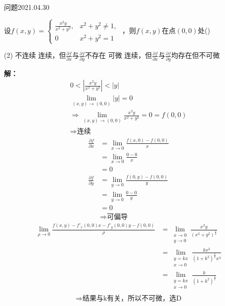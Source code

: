 \begin{mybox}{问题2021.04.30}
	
	\qquad 设$f(x,y)= \begin{cases}
		
		\frac{x^2y}{x^2+y^2},&x^2+y^2\ne 1,\\
		
		0&
		
		x^2+y^2=1
		
	\end{cases}$ ，则$f(x,y)$在点$(0,0)$处() 
	
	\begin{tasks}(2)
		\task 不连续
		\task 连续，但$\frac{\partial{f}}{\partial{x}}$与$\frac{\partial{f}}{\partial{y}}$不存在
		\task 可微
		\task 连续，但$\frac{\partial{f}}{\partial{x}}$与$\frac{\partial{f}}{\partial{y}}$均存在但不可微
	\end{tasks}
	
\end{mybox}
\noindent
\textbf{解：}
\begin{gather*}
	0<\left|\frac{x^2y}{x^2+y^2}\right|<\left|y\right|\\
	\lim\limits_{(x,y) \to (0,0)} |y| =0\\
	\Rightarrow \lim\limits_{(x,y)\to (0,0)} \frac{x^2y}{x^2+y^2} =0 =f(0,0)\\
	\Rightarrow \text{连续}
\end{gather*}
\begin{align*}
	\frac{\partial f}{\partial x} &= \lim \limits_{x \to 0} \frac{f(x,0)-f(0,0)}{x}\\
	&= \lim \limits_{x \to 0} \frac{0-0}{x}\\
	&= 0\\
	\frac{\partial f}{\partial y} &= \lim \limits_{y \to 0} \frac{f(0,y)-f(0,0)}{y}\\
	&= \lim \limits_{y \to 0} \frac{0-0}{y}\\
	&= 0\\
	&\Rightarrow \text{可偏导}
\end{align*}
\begin{align*}
	\lim \limits_{\rho \to 0} \frac{f(x,y)-f'_{x}(0,0)x-f'_{y}(0,0)y -f(0,0)}{\rho} &= \lim\limits_{\substack{x\to 0 \\ y \to 0}} \frac{x^2 y}{(x^2+y^2)^{\frac{3}{2}}}\\
	&= \lim\limits_{\substack{y=kx \\ x \to 0}} \frac{kx^3}{(1+k^2)^{\frac{3}{2}}x^3}\\
	&=  \lim\limits_{\substack{y=kx \\ x \to 0}} \frac{k}{(1+k^2)^{\frac{3}{2}}}\\
\end{align*}
$$\Rightarrow \text{结果与k有关，所以不可微，选D}$$